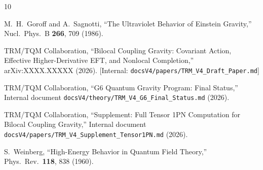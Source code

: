 \documentclass[aps,prd,reprint,nofootinbib]{revtex4-2}
\begin{document}
\begin{thebibliography}{10}

M.~H.~Goroff and A.~Sagnotti,
``The Ultraviolet Behavior of Einstein Gravity,''
Nucl.\ Phys.\ B \textbf{266}, 709 (1986).

TRM/TQM Collaboration,
``Bilocal Coupling Gravity: Covariant Action, Effective Higher-Derivative EFT, and Nonlocal Completion,''
arXiv:XXXX.XXXXX (2026).
[Internal: \texttt{docsV4/papers/TRM\_V4\_Draft\_Paper.md}]

TRM/TQM Collaboration,
``G6 Quantum Gravity Program: Final Status,''
Internal document \texttt{docsV4/theory/TRM\_V4\_G6\_Final\_Status.md} (2026).

TRM/TQM Collaboration,
``Supplement: Full Tensor 1PN Computation for Bilocal Coupling Gravity,''
Internal document \texttt{docsV4/papers/TRM\_V4\_Supplement\_Tensor1PN.md} (2026).

S.~Weinberg,
``High-Energy Behavior in Quantum Field Theory,''
Phys.\ Rev.\ \textbf{118}, 838 (1960).

\end{thebibliography}
\end{document}
